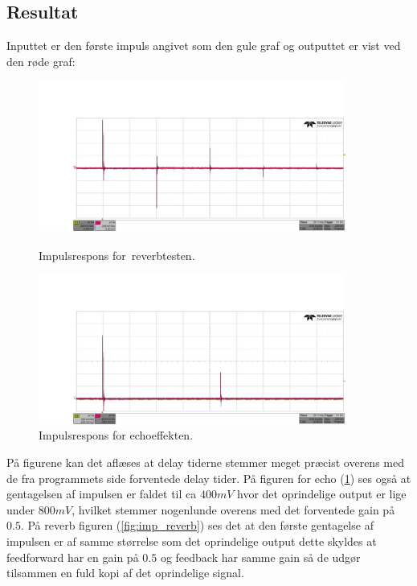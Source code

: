 \subsection{Resultat}
Inputtet er den første impuls angivet som den gule graf og outputtet er vist ved den røde graf:
\begin{figure}[!ht]
		\centering
	\begin{minipage}{0.50\textwidth}
		\centering
		\includegraphics[width=0.9\textwidth, height=5cm]{billeder/reverb.png}
		\caption{Impulsrespons for reverbtesten.}
		\label{fig:imp_reverb}
	\end{minipage}\hfill
	\begin{minipage}{0.50\textwidth}
		\centering
		\includegraphics[width=0.9\textwidth, height=5 cm]{billeder/echo.png}
		\caption{Impulsrespons for echoeffekten.}
		\label{fig:imp_echo}
	\end{minipage}
\end{figure}
På figurene kan det aflæses at delay tiderne stemmer meget præcist overens med de fra programmets side forventede delay tider. På figuren for echo (\ref{fig:imp_echo}) ses også at gentagelsen af impulsen er faldet til ca $400\si{mV}$ hvor det oprindelige output er lige under $800\si{mV}$, hvilket stemmer nogenlunde overens med det forventede gain på $0.5$.\newline 
På reverb figuren (\ref{fig:imp_reverb}) ses det at den første gentagelse af impulsen er af samme størrelse som det oprindelige output dette skyldes at feedforward har en gain på $0.5$ og feedback har samme gain så de udgør tilsammen en fuld kopi af det oprindelige signal. 
